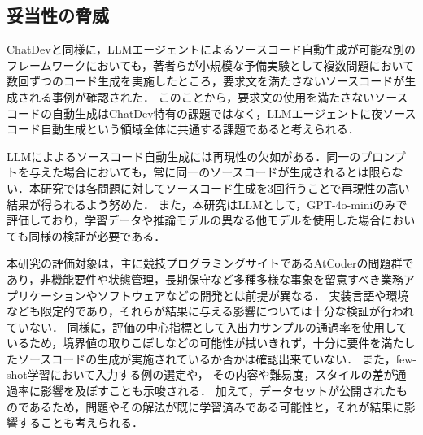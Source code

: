 \documentclass[submit,techrep,noauthor]{ipsj}
\newcommand{\memo}[1]{\colorbox{magenta!30}{{\bf MEMO}:}{\color{red!50} {\textbf{[#1]}}}}
\begin{document}
\subsection{妥当性の脅威}
ChatDevと同様に，LLMエージェントによるソースコード自動生成が可能な別のフレームワークにおいて\cite{kiro}も，著者らが小規模な予備実験として複数問題において数回ずつのコード生成を実施したところ，要求文を満たさないソースコードが生成される事例が確認された．
このことから，要求文の使用を満たさないソースコードの自動生成はChatDev特有の課題ではなく，LLMエージェントに夜ソースコード自動生成という領域全体に共通する課題であると考えられる．

LLMによよるソースコード自動生成には再現性の欠如がある．同一のプロンプトを与えた場合においても，常に同一のソースコードが生成されるとは限らない．本研究では各問題に対してソースコード生成を3回行うことで再現性の高い結果が得られるよう努めた．
また，本研究はLLMとして，GPT-4o-miniのみで評価しており，学習データや推論モデルの異なる他モデルを使用した場合においても同様の検証が必要である．

本研究の評価対象は，主に競技プログラミングサイトであるAtCoderの問題群であり，非機能要件や状態管理，長期保守など多種多様な事象を留意すべき業務アプリケーションやソフトウェアなどの開発とは前提が異なる．
実装言語や環境なども限定的であり，それらが結果に与える影響については十分な検証が行われていない．
同様に，評価の中心指標として入出力サンプルの通過率を使用しているため，境界値の取りこぼしなどの可能性が拭いきれず，十分に要件を満たしたソースコードの生成が実施されているか否かは確認出来ていない．
また，few-shot学習において入力する例の選定や，
その内容や難易度，スタイルの差が通過率に影響を及ぼすことも示唆される．
加えて，データセットが公開されたものであるため，問題やその解法が既に学習済みである可能性と，それが結果に影響することも考えられる．
\end{document}
